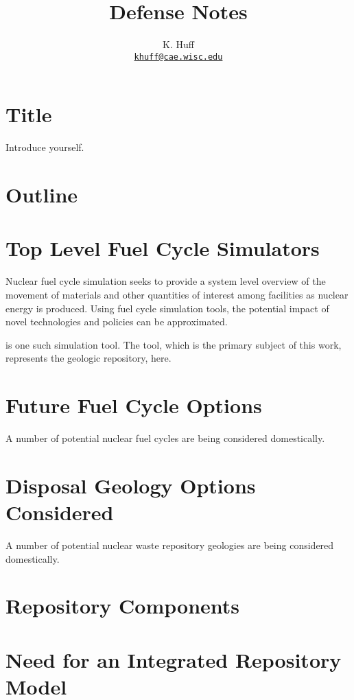 \documentclass[letterpaper]{article}
\author{K. Huff
\\ \href{mailto:khuff@cae.wisc.edu}{\texttt{khuff@cae.wisc.edu}}
}
\date{}
\title{Defense Notes}
\begin{document}
\maketitle

\section*{Title}

Introduce yourself.

\section*{Outline}



\section*{Top Level Fuel Cycle Simulators}

Nuclear fuel cycle simulation seeks to provide a system level overview of the 
movement of materials and other quantities of interest among facilities as 
nuclear energy is produced. Using fuel cycle simulation tools, the potential 
impact of novel technologies and policies can be approximated. 

\Cyclus is one such simulation tool. The \Cyder tool, which is the primary 
subject of this work, represents the geologic repository, here.

\section*{Future Fuel Cycle Options}

A number of potential nuclear fuel cycles are being considered domestically. 

\section*{Disposal Geology Options Considered}

A number of potential nuclear waste repository geologies are being considered 
domestically. 

\section*{Repository Components}



\section*{Need for an Integrated Repository Model}
\end{document}
